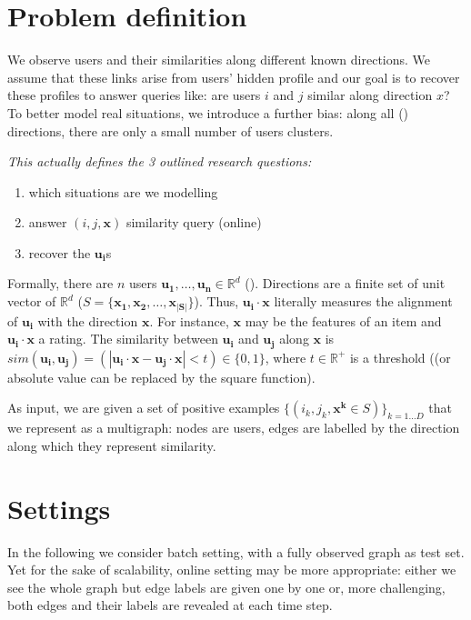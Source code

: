 \section{Problem definition}

We observe users and their similarities along different known directions. We
assume that these links arise from users' hidden profile and our goal is to
recover these profiles to answer queries like: are users $i$ and $j$ similar
along direction $x$? To better model real situations, we introduce a further
bias: along all () directions, there are only a small number
of users clusters.

\begin{center}
	\itshape\small
	This actually defines the 3 outlined research questions:
	\begin{enumerate}
		\item which situations are we modelling
		\item answer $(i,j,\bm{x})$ similarity query (online)
		\item recover the $\bm{u_i}$s
	\end{enumerate}
\end{center}

Formally, there are $n$ users $\bm{u_1}, \ldots, \bm{u_n} \in \mathbb{R}^d$
(). Directions are a finite set
of unit vector of $\mathbb{R}^d$ ($S=\{\bm{x_1}, \bm{x_2}, \ldots,
\bm{x_{|S|}}\}$). Thus, $\bm{u_i}\cdot \bm{x}$ literally measures the alignment
of $\bm{u_i}$ with the direction $\bm{x}$. For instance, $\bm{x}$ may be the
features of an item and $\bm{u_i}\cdot \bm{x}$ a rating. The similarity between
$\bm{u_i}$ and $\bm{u_j}$ along $\bm{x}$ is $sim(\bm{u_i}, \bm{u_j}) = \left( |
\bm{u_i} \cdot \bm{x} - \bm{u_j} \cdot \bm{x}| < t \right) \in \{0, 1\}$, where
$t \in \mathbb{R}^+$ is a threshold (\comment(or absolute value can be replaced
by the square function).

As input, we are given a set of positive examples $\{(i_k, j_k, \bm{x^k}\in
S)\}_{k=1\ldots D}$ that we represent as a multigraph: nodes are users, edges
are labelled by the direction along which they represent similarity.

\section{Settings}

In the following we consider batch setting, with a fully observed graph as test
set. Yet for the sake of scalability, online setting may be more appropriate:
either we see the whole graph but edge labels are given one by one or, more
challenging, both edges and their labels are revealed at each time step.

